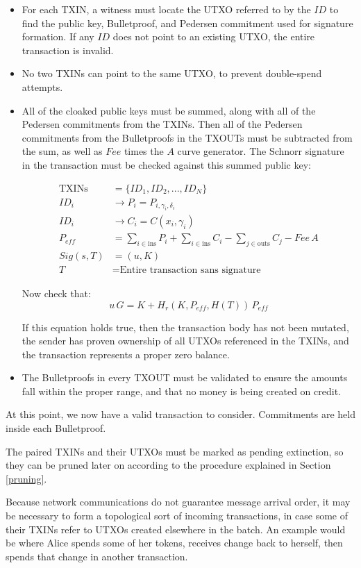 \documentclass[a4paper, 10pt, conference]{ieeeconf}
\begin{document}
\begin{itemize}
	\item{For each TXIN, a witness must locate the UTXO referred to by the $ID$ to find the public key, Bulletproof, and Pedersen commitment used for signature formation. If any $ID$ does not point to an existing UTXO, the entire transaction is invalid.}
	\item{No two TXINs can point to the same UTXO, to prevent double-spend attempts.}
	\item{All of the cloaked public keys must be summed, along with all of the Pedersen commitments from the TXINs. Then all of the Pedersen commitments from the Bulletproofs in the TXOUTs must be subtracted from the sum, as well as $Fee$ times the $A$ curve generator. The Schnorr signature in the transaction must be checked against this summed public key:

	\begin{align*}
		\text{TXINs} &= \{ID_1, ID_2, ..., ID_N\} \\
		ID_i &\rightarrow P_i = P_{i, \gamma_i, \delta_i}\\
		ID_i &\rightarrow C_i = C(x_i, \gamma_i)\\
		P_{eff} &= \sum_{i \in \text{ins}}{P_i} + \sum_{i \in \text{ins}}{C_i}  - \sum_{j \in \text{outs}}{C_j} - Fee\,A\\
		Sig(s, T) &= (u, K)\\
		T &= \text{Entire transaction sans signature}
	\end{align*}

	Now check that:
	$$u \, G = K + H_r(K, P_{eff}, H(T)) \, P_{eff}$$
	
	If this equation holds true, then the transaction body has not been mutated, the sender has proven ownership of all UTXOs referenced in the TXINs, and the transaction represents a proper zero balance.}
	\item{The Bulletproofs in every TXOUT must be validated to ensure the amounts fall within the proper range, and that no money is being created on credit.}
\end{itemize}

At this point, we now have a valid transaction to consider. Commitments are held inside each Bulletproof.

The paired TXINs and their UTXOs must be marked as pending extinction, so they can be pruned later on according to the procedure explained in Section \ref{pruning}.

Because network communications do not guarantee message arrival order, it may be necessary to form a topological sort of incoming transactions, in case some of their TXINs refer to UTXOs created elsewhere in the batch. An example would be where Alice spends some of her tokens, receives change back to herself, then spends that change in another transaction.
\end{document}

